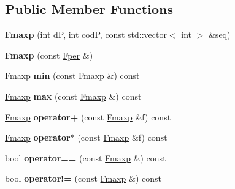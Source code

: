 \subsection*{Public Member Functions}
\begin{DoxyCompactItemize}
\item 
\mbox{\label{classetvo_i_i_1_1_fmaxp_a8a25abfc85dac08a0333d77ea049647e}} 
{\bfseries Fmaxp} (int dP, int codP, const std\+::vector$<$ int $>$ \&seq)
\item 
\mbox{\label{classetvo_i_i_1_1_fmaxp_ad5a99b9640644bef88f1eaa5777d65ff}} 
{\bfseries Fmaxp} (const \mbox{\hyperlink{classetvo_i_i_1_1_fper}{Fper}} \&)
\item 
\mbox{\label{classetvo_i_i_1_1_fmaxp_ab49bf80d2fa170f7271e50e1e49e6192}} 
\mbox{\hyperlink{classetvo_i_i_1_1_fmaxp}{Fmaxp}} {\bfseries min} (const \mbox{\hyperlink{classetvo_i_i_1_1_fmaxp}{Fmaxp}} \&) const
\item 
\mbox{\label{classetvo_i_i_1_1_fmaxp_a34e208f0e70930980603d8d9c8d73508}} 
\mbox{\hyperlink{classetvo_i_i_1_1_fmaxp}{Fmaxp}} {\bfseries max} (const \mbox{\hyperlink{classetvo_i_i_1_1_fmaxp}{Fmaxp}} \&) const
\item 
\mbox{\label{classetvo_i_i_1_1_fmaxp_a79086bdd6a2464f6765d0f2f1ef20e98}} 
\mbox{\hyperlink{classetvo_i_i_1_1_fmaxp}{Fmaxp}} {\bfseries operator+} (const \mbox{\hyperlink{classetvo_i_i_1_1_fmaxp}{Fmaxp}} \&f) const
\item 
\mbox{\label{classetvo_i_i_1_1_fmaxp_aae09e9a936f66c77dcdb78753190bcf7}} 
\mbox{\hyperlink{classetvo_i_i_1_1_fmaxp}{Fmaxp}} {\bfseries operator$\ast$} (const \mbox{\hyperlink{classetvo_i_i_1_1_fmaxp}{Fmaxp}} \&f) const
\item 
\mbox{\label{classetvo_i_i_1_1_fmaxp_a189a53e2cdddeccf6f4a99158cb063e5}} 
bool {\bfseries operator==} (const \mbox{\hyperlink{classetvo_i_i_1_1_fmaxp}{Fmaxp}} \&) const
\item 
\mbox{\label{classetvo_i_i_1_1_fmaxp_af65b31aa0bfe94b70121c428e51d9ee2}} 
bool {\bfseries operator!=} (const \mbox{\hyperlink{classetvo_i_i_1_1_fmaxp}{Fmaxp}} \&) const

\end{DoxyCompactItemize}
